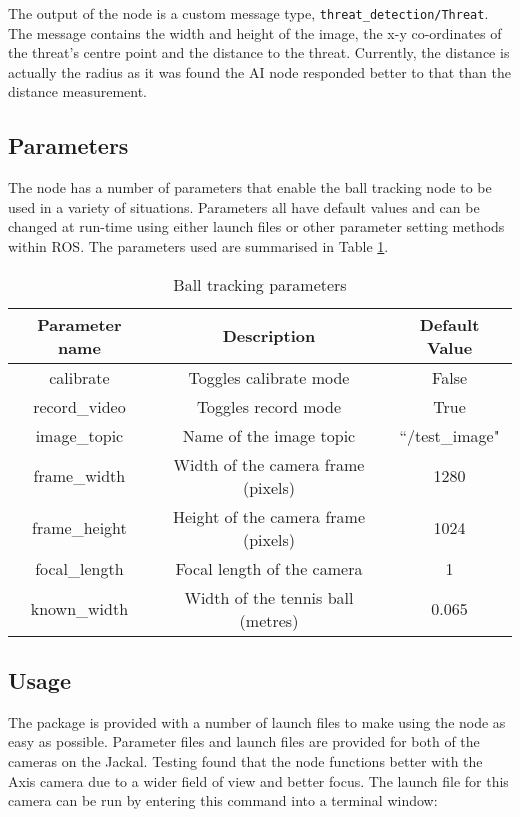 \documentclass[../main.tex]{subfiles}
\begin{document}
The output of the node is a custom message type, \texttt{threat\_detection/Threat}. The message contains the width and height of the image, the x-y co-ordinates of the threat's centre point and the distance to the threat. Currently, the distance is actually the radius as it was found the AI node responded better to that than the distance measurement.

\subsection{Parameters}
The node has a number of parameters that enable the ball tracking node to be used in a variety of situations. Parameters all have default values and can be changed at run-time using either launch files or other parameter setting methods within ROS. The parameters used are summarised in Table \ref{tab:params}.

\begin{table}[]
    \centering
    \begin{tabular}{c|c|c}
        \textbf{Parameter name} & \textbf{Description} &    \textbf{Default Value}  \\
        \hline
        calibrate & Toggles calibrate mode & False \\
        record\_video & Toggles record mode & True \\
        image\_topic & Name of the image topic & ``/test\_image" \\
        frame\_width & Width of the camera frame (pixels) & 1280 \\
        frame\_height & Height of the camera frame (pixels) & 1024 \\
        focal\_length & Focal length of the camera & 1 \\
        known\_width & Width of the tennis ball (metres) & 0.065
    \end{tabular}
    \caption{Ball tracking parameters}
    \label{tab:params}
\end{table}

\subsection{Usage}
The package is provided with a number of launch files to make using the node as easy as possible. Parameter files and launch files are provided for both of the cameras on the Jackal. Testing found that the node functions better with the Axis camera due to a wider field of view and better focus. The launch file for this camera can be run by entering this command into a terminal window:
\end{document}
